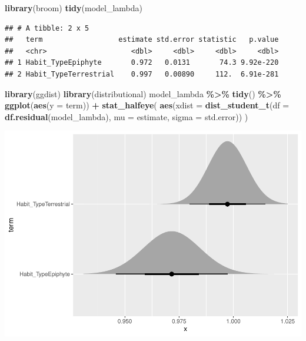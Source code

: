 \documentclass[
]{book}
\newenvironment{Shaded}{\begin{snugshade}}{\end{snugshade}}
\newcommand{\AttributeTok}[1]{\textcolor[rgb]{0.13,0.29,0.53}{#1}}
\newcommand{\FunctionTok}[1]{\textcolor[rgb]{0.13,0.29,0.53}{\textbf{#1}}}
\newcommand{\NormalTok}[1]{#1}
\newcommand{\SpecialCharTok}[1]{\textcolor[rgb]{0.81,0.36,0.00}{\textbf{#1}}}
\theoremstyle{definition}
\theoremstyle{definition}
\theoremstyle{definition}
\theoremstyle{definition}
\theoremstyle{remark}
\begin{document}
\begin{Shaded}
\begin{Highlighting}[]
\FunctionTok{library}\NormalTok{(broom)}
\FunctionTok{tidy}\NormalTok{(model\_lambda)}
\end{Highlighting}
\end{Shaded}

\begin{verbatim}
## # A tibble: 2 x 5
##   term                  estimate std.error statistic   p.value
##   <chr>                    <dbl>     <dbl>     <dbl>     <dbl>
## 1 Habit_TypeEpiphyte       0.972   0.0131       74.3 9.92e-220
## 2 Habit_TypeTerrestrial    0.997   0.00890     112.  6.91e-281
\end{verbatim}

\begin{Shaded}
\begin{Highlighting}[]
\FunctionTok{library}\NormalTok{(ggdist)}
\FunctionTok{library}\NormalTok{(distributional)}
\NormalTok{model\_lambda }\SpecialCharTok{\%\textgreater{}\%}
  \FunctionTok{tidy}\NormalTok{() }\SpecialCharTok{\%\textgreater{}\%}
  \FunctionTok{ggplot}\NormalTok{(}\FunctionTok{aes}\NormalTok{(}\AttributeTok{y =}\NormalTok{ term)) }\SpecialCharTok{+}
  \FunctionTok{stat\_halfeye}\NormalTok{(}
    \FunctionTok{aes}\NormalTok{(}\AttributeTok{xdist =} \FunctionTok{dist\_student\_t}\NormalTok{(}\AttributeTok{df =} \FunctionTok{df.residual}\NormalTok{(model\_lambda), }\AttributeTok{mu =}\NormalTok{ estimate, }\AttributeTok{sigma =}\NormalTok{ std.error))}
\NormalTok{  )}
\end{Highlighting}
\end{Shaded}

\includegraphics{Diagnostico_Poblacional_files/figure-latex/unnamed-chunk-27-1.pdf}
\end{document}
